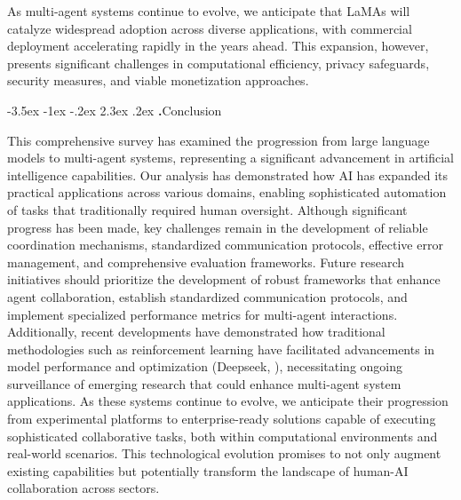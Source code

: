 \documentclass[journal,twoside,10pt]{IEEEtran}
\makeatletter
\renewcommand\section{\@startsection{section}{1}{\z@}%
                       {-3.5ex \@plus -1ex \@minus -.2ex}%
                       {2.3ex \@plus.2ex}%
                       {\normalfont\Large\bfseries\Roman{section}.\quad}}
\makeatother
\begin{document}
As multi-agent systems continue to evolve, we anticipate that LaMAs will catalyze widespread adoption across diverse applications, with commercial deployment accelerating rapidly in the years ahead. This expansion, however, presents significant challenges in computational efficiency, privacy safeguards, security measures, and viable monetization approaches.

\section{Conclusion}

This comprehensive survey has examined the progression from large language models to multi-agent systems, representing a significant advancement in artificial intelligence capabilities. 
Our analysis has demonstrated how AI has expanded its practical applications across various domains, enabling sophisticated automation of tasks that traditionally required human oversight. 
Although significant progress has been made, key challenges remain in the development of reliable coordination mechanisms, standardized communication protocols, effective error management, and comprehensive evaluation frameworks. 
Future research initiatives should prioritize the development of robust frameworks that enhance agent collaboration, establish standardized communication protocols, and implement specialized performance metrics for multi-agent interactions. 
Additionally, recent developments have demonstrated how traditional methodologies such as reinforcement learning have facilitated advancements in model performance and optimization (Deepseek, \cite{liu2024deepseekv3}), necessitating ongoing surveillance of emerging research that could enhance multi-agent system applications. 
As these systems continue to evolve, we anticipate their progression from experimental platforms to enterprise-ready solutions capable of executing sophisticated collaborative tasks, both within computational environments and real-world scenarios. 
This technological evolution promises to not only augment existing capabilities but potentially transform the landscape of human-AI collaboration across sectors.




 
\end{document}
